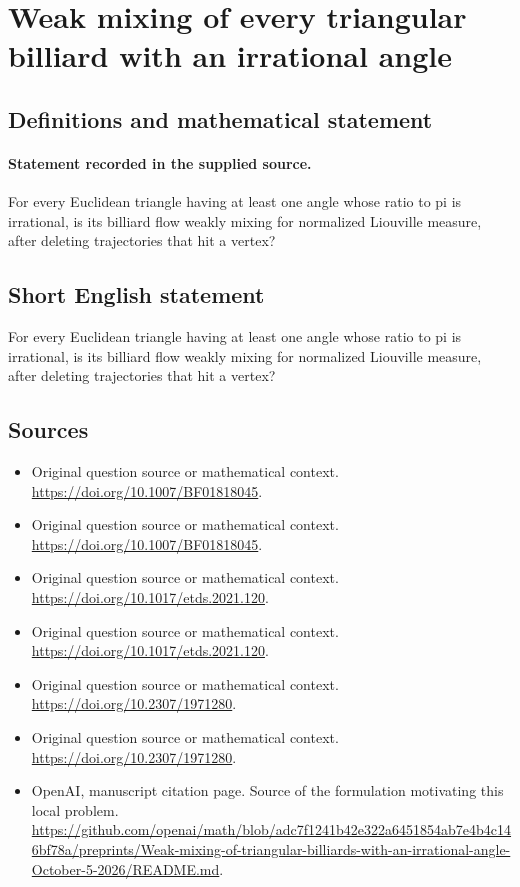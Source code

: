 \documentclass[11pt]{article}
\begin{document}
\section*{Weak mixing of every triangular billiard with an irrational angle}\label{30007164}
\subsection{Definitions and mathematical statement}
\paragraph{Statement recorded in the supplied source.}
For every Euclidean triangle having at least one angle whose ratio to pi is irrational, is its billiard flow weakly mixing for normalized Liouville measure, after deleting trajectories that hit a vertex?
\subsection{Short English statement}
For every Euclidean triangle having at least one angle whose ratio to pi is irrational, is its billiard flow weakly mixing for normalized Liouville measure, after deleting trajectories that hit a vertex?
\subsection{Sources}
\begin{itemize}
\item[S1] Original question source or mathematical context.
\url{https://doi.org/10.1007/BF01818045}.
\item[S2] Original question source or mathematical context.
\url{https://doi.org/10.1007/BF01818045}.
\item[S3] Original question source or mathematical context.
\url{https://doi.org/10.1017/etds.2021.120}.
\item[S4] Original question source or mathematical context.
\url{https://doi.org/10.1017/etds.2021.120}.
\item[S5] Original question source or mathematical context.
\url{https://doi.org/10.2307/1971280}.
\item[S6] Original question source or mathematical context.
\url{https://doi.org/10.2307/1971280}.
\item[S7] OpenAI, manuscript citation page. Source of the formulation motivating this local problem.
\url{https://github.com/openai/math/blob/adc7f1241b42e322a6451854ab7e4b4c146bf78a/preprints/Weak-mixing-of-triangular-billiards-with-an-irrational-angle-October-5-2026/README.md}.
\end{itemize}
\end{document}
